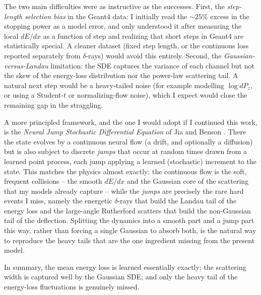 \documentclass[11pt]{article}
\begin{document}
The two main difficulties were as instructive as the successes. First, the
\emph{step-length selection bias} in the Geant4 data: I initially read the
$\sim25\%$ excess in the stopping power as a model error, and only understood it
after measuring the local $dE/dx$ as a function of step and realizing that short
steps in Geant4 are statistically special. A cleaner dataset (fixed step length,
or the continuous loss reported separately from $\delta$-rays) would avoid this
entirely. Second, the \emph{Gaussian-versus-Landau} limitation: the SDE captures
the variance of each channel but not the skew of the energy-loss distribution nor
the power-law scattering tail. A natural next step would be a heavy-tailed noise
(for example modelling $\log dP_z$, or using a Student-$t$ or normalizing-flow
noise), which I expect would close the remaining gap in the straggling.

A more principled framework, and the one I would adopt if I continued this work,
is the \emph{Neural Jump Stochastic Differential Equation} of Jia and Benson
\cite{njsde}. There the state evolves by a continuous neural flow (a drift, and
optionally a diffusion) but is also subject to discrete \emph{jumps} that occur at
random times drawn from a learned point process, each jump applying a learned
(stochastic) increment to the state. This matches the physics almost exactly: the
continuous flow is the soft, frequent collisions -- the smooth $dE/dx$ and the
Gaussian core of the scattering that my models already capture -- while the
\emph{jumps} are precisely the rare hard events I miss, namely the energetic
$\delta$-rays that build the Landau tail of the energy loss and the large-angle
Rutherford scatters that build the non-Gaussian tail of the deflection. Splitting
the dynamics into a smooth part and a jump part this way, rather than forcing a
single Gaussian to absorb both, is the natural way to reproduce the heavy tails
that are the one ingredient missing from the present model.

In summary, the mean energy loss is learned essentially exactly; the scattering
width is captured well by the Gaussian SDE; and only the heavy tail of the
energy-loss fluctuations is genuinely missed.
\end{document}
